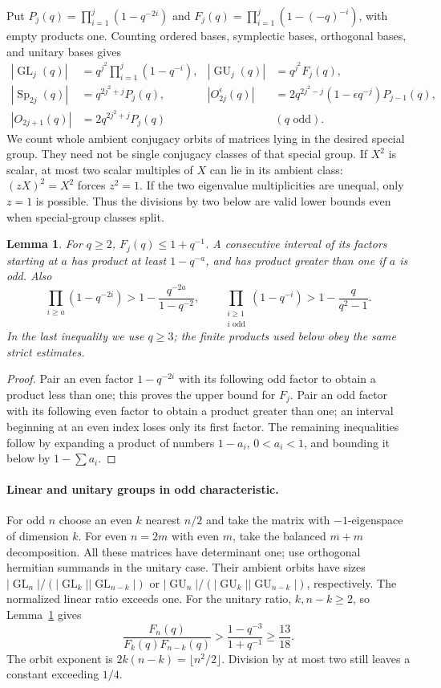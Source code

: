 \documentclass[10pt]{article}
\newtheorem{lemma}[theorem]{Lemma}
\newcommand{\GL}{\operatorname{GL}}
\newcommand{\GU}{\operatorname{GU}}
\newcommand{\Sp}{\operatorname{Sp}}
\begin{document}
Put $P_j(q)=\prod_{i=1}^j(1-q^{-2i})$ and
$F_j(q)=\prod_{i=1}^j(1-(-q)^{-i})$, with empty products one. Counting
ordered bases, symplectic bases, orthogonal bases, and unitary bases gives
\begin{align*}
|\GL_j(q)|&=q^{j^2}\prod_{i=1}^j(1-q^{-i}),&
|\GU_j(q)|&=q^{j^2}F_j(q),\\
|\Sp_{2j}(q)|&=q^{2j^2+j}P_j(q),&
|O_{2j}^{\epsilon}(q)|&=2q^{2j^2-j}(1-\epsilon q^{-j})P_{j-1}(q),\\
|O_{2j+1}(q)|&=2q^{2j^2+j}P_j(q)&& (q\text{ odd}).
\end{align*}
We count whole ambient conjugacy orbits of matrices lying in the desired
special group. They need not be single conjugacy classes of that special
group. If $X^2$ is scalar, at most two scalar multiples of $X$ can lie in
its ambient class: $(zX)^2=X^2$ forces $z^2=1$. If the two eigenvalue
multiplicities are unequal, only $z=1$ is possible. Thus the divisions by
two below are valid lower bounds even when special-group classes split.

\begin{lemma}\label{products}
For $q\ge2$, $F_j(q)\le1+q^{-1}$. A consecutive interval of its factors
starting at $a$ has product at least $1-q^{-a}$, and has product greater
than one if $a$ is odd. Also
\[
\prod_{i\ge a}(1-q^{-2i})>1-\frac{q^{-2a}}{1-q^{-2}},\qquad
\prod_{\substack{i\ge1\\i\text{ odd}}}(1-q^{-i})
>1-\frac q{q^2-1}.
\]
In the last inequality we use $q\ge3$; the finite products used below obey
the same strict estimates.
\end{lemma}
\begin{proof}
Pair an even factor $1-q^{-2i}$ with its following odd factor to obtain a
product less than one; this proves the upper bound for $F_j$. Pair an odd
factor with its following even factor to obtain a product greater than
one; an interval beginning at an even index loses only its first factor.
The remaining inequalities follow by expanding a product of numbers
$1-a_i$, $0<a_i<1$, and bounding it below by $1-\sum a_i$.
\end{proof}

\paragraph{Linear and unitary groups in odd characteristic.}
For odd $n$ choose an even $k$ nearest $n/2$ and take the matrix with
$-1$-eigenspace of dimension $k$. For even $n=2m$ with even $m$, take
the balanced $m+m$ decomposition. All these matrices have determinant
one; use orthogonal hermitian summands in the unitary case. Their ambient
orbits have sizes $|\GL_n|/(|\GL_k||\GL_{n-k}|)$ or
$|\GU_n|/(|\GU_k||\GU_{n-k}|)$, respectively. The normalized linear
ratio exceeds one. For the unitary ratio, $k,n-k\ge2$, so Lemma~\ref{products}
gives
\[
\frac{F_n(q)}{F_k(q)F_{n-k}(q)}
>\frac{1-q^{-3}}{1+q^{-1}}\ge\frac{13}{18}.
\]
The orbit exponent is $2k(n-k)=\lfloor n^2/2\rfloor$. Division by at
most two still leaves a constant exceeding $1/4$.
\end{document}

